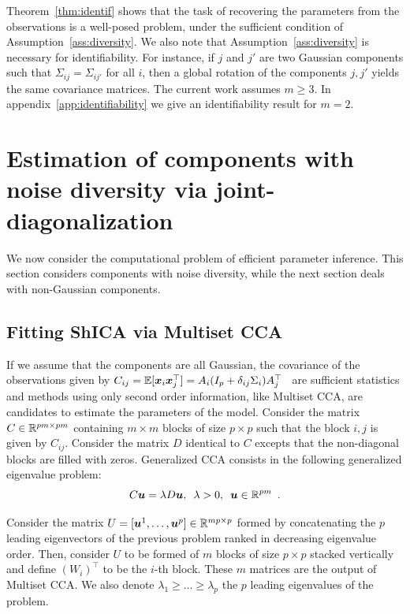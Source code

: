 Theorem~\ref{thm:identif} shows that the task of recovering the parameters from
the observations is a well-posed problem, under the sufficient condition of
Assumption~\ref{ass:diversity}.  We also note that
Assumption~\ref{ass:diversity} is necessary for identifiability. For instance,
if $j$ and $j'$ are two Gaussian components such that $\Sigma_{ij} =
\Sigma_{ij'}$ for all $i$, then a global rotation of the components $j, j'$
yields the same covariance matrices. The current work assumes $m \geq 3$. In appendix~\ref{app:identifiability} we give an identifiability result for $m=2$.



\section{Estimation of components with noise diversity via joint-diagonalization}

We now consider the computational problem of efficient parameter inference. This section considers components with noise diversity, while the next section deals with non-Gaussian components.


\subsection{Fitting ShICA via Multiset CCA}
If we assume that the components are all Gaussian, %
the covariance of the observations given by
$C_{ij}=  \mathbb{E}[\boldsymbol{x}_i\boldsymbol{x}_j^\top] = A_i(I_p + \delta_{ij}\Sigma_i)A_j^{\top}\enspace
$ are sufficient statistics and methods using only second order information, like Multiset CCA, are candidates to estimate the parameters of the model.
Consider the
matrix $C \in \mathbb{R}^{pm \times pm}$ containing $m \times m$ blocks of size $p
\times p$
such that the block $i,j$ is given by $C_{ij}$. Consider the matrix $D$ identical to $C$ excepts that the non-diagonal blocks are filled with zeros. 
Generalized CCA consists in the following generalized eigenvalue problem:
\begin{equation}
\label{eq:eigv}
    C \boldsymbol{u} = \lambda D\boldsymbol{u},\enspace \lambda > 0,\enspace \boldsymbol{u}\in\mathbb{R}^{pm} \enspace .
\end{equation}
  
Consider the matrix $U = [\boldsymbol{u}^1, \dots, \boldsymbol{u}^p] \in \mathbb{R}^{mp \times p}$ formed by concatenating the $p$ leading eigenvectors of the previous problem ranked in decreasing eigenvalue order. Then, consider $U$ to be formed of $m$ blocks of size $p \times p$ stacked vertically and define $(W_i)^{\top}$ to be the $i$-th block. These $m$ matrices are the output of Multiset CCA. We also denote $\lambda_1 \geq \dots \geq \lambda_p$ the $p$ leading eigenvalues of the problem.

